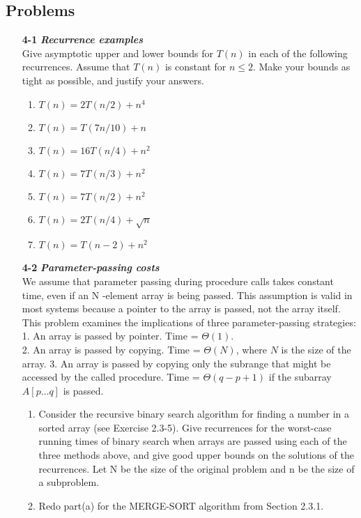 \documentclass[fontsize=12pt,paper=a4]{book}
\begin{document}
\subsection*{Problems}
\begin{enumerate}
	\item[\textbf{4-1}]
		\textbf{\textit{Recurrence examples}}\\
		Give asymptotic upper and lower bounds for $T(n)$ in each of the following recurrences. Assume that $T(n)$ is constant for $n \leq 2$. Make your bounds as tight as possible, and justify your answers.
		\begin{enumerate}
			\item $T(n) = 2T(n/2) + n^4$			
			\item $T(n) = T(7n/10) + n$			
			\item $T(n) = 16T(n/4) + n^2$			
			\item $T(n) = 7T(n/3) + n^2$			
			\item $T(n) = 7T(n/2) + n^2$			
			\item $T(n) = 2T(n/4) + \sqrt{n}$			
			\item $T(n) = T(n-2) + n^2$
		\end{enumerate}		
	
	\item[\textbf{4-2}]
		\textbf{\textit{Parameter-passing costs}}\\
		We assume that parameter passing during procedure calls takes constant time, even if an N -element array is being passed. This assumption is valid in most systems because a pointer to the array is passed, not the array itself. This problem examines the implications of three parameter-passing strategies:\\
		1. An array is passed by pointer. Time = $\Theta(1)$.\\
		2. An array is passed by copying. Time = $\Theta(N)$, where $N$ is the size of the array.
		3. An array is passed by copying only the subrange that might be accessed by the
called procedure. Time = $\Theta(q - p + 1)$ if the subarray $A[p \dots q]$ is passed.
		\begin{enumerate}
			\item Consider the recursive binary search algorithm for finding a number in a sorted array (see Exercise 2.3-5). Give recurrences for the worst-case running times
of binary search when arrays are passed using each of the three methods above, and give good upper bounds on the solutions of the recurrences. Let N be the size of the original problem and n be the size of a subproblem.
			\item Redo part(a) for the MERGE-SORT algorithm from Section 2.3.1.
		\end{enumerate}
		

\end{enumerate}
\end{document}
